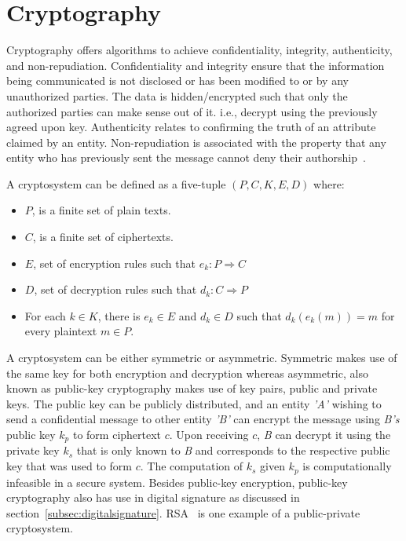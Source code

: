 \section{Cryptography} \label{sec:cryptography}
Cryptography offers algorithms to achieve confidentiality, integrity,
authenticity, and non-repudiation. Confidentiality and integrity ensure that
the information being communicated is not disclosed or has been modified to or
by any unauthorized parties. The data is hidden/encrypted such that only the
authorized parties can make sense out of it. i.e., decrypt using the previously
agreed upon key. Authenticity relates to confirming the truth of an attribute
claimed by an entity. Non-repudiation is associated with the property that any
entity who has previously sent the message cannot deny their
authorship~\cite{katz1996handbook}. \par 
A cryptosystem can be defined as a five-tuple $(P, C, K, E, D)$ where: 
\begin{itemize}
	\item $P$, is a finite set of plain texts.
	\item $C$, is a finite set of ciphertexts.
	\item $E$, set of encryption rules such that $e_{k}:P \Rightarrow C$
	\item $D$, set of decryption rules such that $d_{k}:C \Rightarrow P$ 
	\item For each $k \in K$, there is $e_k \in E$ and $d_k \in D$ such that $d_k(e_k(m)) = m$ for every plaintext $m \in P$.
\end{itemize}
A cryptosystem can be either symmetric or asymmetric. Symmetric makes use of
the same key for both encryption and decryption whereas asymmetric, also known
as public-key cryptography makes use of key pairs, public and private keys. The
public key can be publicly distributed, and an entity \textit{'A'} wishing to
send a confidential message to other entity \textit{'B'} can encrypt the
message using \textit{B's} public key $k_{p}$ to form ciphertext $c$. Upon
receiving $c$, \textit{B} can decrypt it using the private key $k_{s}$ that is
only known to \textit{B} and corresponds to the respective public key that was
used to form $c$. The computation of $k_{s}$ given $k_{p}$ is computationally
infeasible in a secure system. Besides public-key encryption, public-key
cryptography also has use in digital signature as discussed in
section~\ref{subsec:digitalsignature}. RSA~\cite{rivest1978method} is one example
of a public-private cryptosystem.

